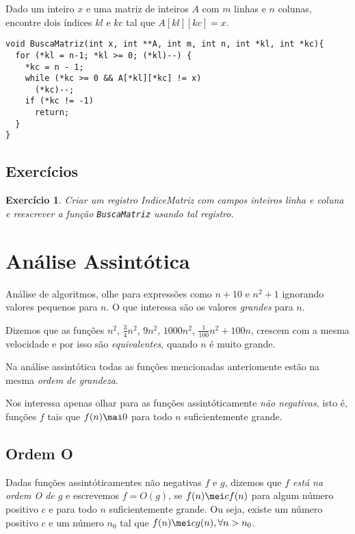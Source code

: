 \documentclass[a4paper]{memoir}
\newtheorem{eex}{Exerc\'icio}
\begin{document}
Dado um inteiro $x$ e uma matriz de inteiros $A$ com $m$ linhas e $n$ colunas, encontre dois índices $kl$ e $kc$ tal que $A[kl][kc] = x$.

\begin{verbatim}
void BuscaMatriz(int x, int **A, int m, int n, int *kl, int *kc){
  for (*kl = n-1; *kl >= 0; (*kl)--) {
    *kc = n - 1;
    while (*kc >= 0 && A[*kl][*kc] != x)
      (*kc)--;
    if (*kc != -1)
      return;
  }
}
\end{verbatim}

\section{Exercícios}

\begin{eex}
Criar um registro \emph{IndiceMatriz} com campos inteiros \emph{linha} e \emph{coluna} e reescrever a função \verb|BuscaMatriz| usando tal registro.
\end{eex}

\chapter{Análise Assintótica}

Análise de algoritmos, olhe para expressões como $n+10$ e $n^2+1$ ignorando valores pequenos para $n$. O que interessa são os valores \emph{grandes} para $n$.

Dizemos que as funções $n^2$, $\frac{3}{4}n^2$, $9n^2$, $1000n^2$, $\frac{1}{100}n^2 + 100n$, crescem com a mesma velocidade e por isso são \emph{equivalentes}, quando $n$ é muito grande.

Na análise assintótica todas as funções mencionadas anteriomente estão na mesma \emph{ordem de grandeza}.

Nos interessa apenas olhar para as funções assintóticamente \emph{não negativas}, isto é, funções $f$ tais que $f(n) \mai 0$ para todo $n$ suficientemente grande.

\section{Ordem O}

\begin{defn}
Dadas funções assintóticamentes não negativas $f$ e $g$, dizemos que \emph{$f$ está na ordem O de $g$} e escrevemos $f = O(g)$, se $f(n) \mei c f(n)$ para algum número positivo $c$ e para todo $n$ suficientemente grande.	Ou seja, existe um número positivo $c$ e um número $n_0$ tal que $f(n) \mei c g(n), \forall n > n_0$.

\end{defn}
\end{document}
